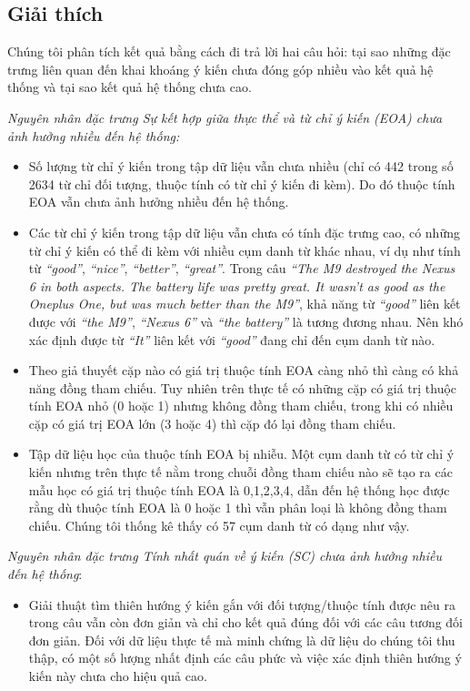 \documentclass[12pt]{report}
\begin{document}
		\subsection*{Giải thích}
			\par Chúng tôi phân tích kết quả bằng cách đi trả lời hai câu hỏi: tại sao những đặc trưng liên quan đến khai khoáng ý kiến chưa đóng góp nhiều vào kết quả hệ thống và tại sao kết quả hệ thống chưa cao.
			\par \textit{Nguyên nhân đặc trưng \textit{Sự kết hợp giữa thực thể và từ chỉ ý kiến (EOA)} chưa ảnh hưởng nhiều đến hệ thống:}
				\begin{itemize}
					\item{Số lượng từ chỉ ý kiến trong tập dữ liệu vẫn chưa nhiều (chỉ có 442 trong số 2634 từ chỉ đối tượng, thuộc tính có từ chỉ ý kiến đi kèm). Do đó thuộc tính EOA vẫn chưa ảnh hưởng nhiều đến hệ thống}.
					\item{Các từ chỉ ý kiến trong tập dữ liệu vẫn chưa có tính đặc trưng cao, có những từ chỉ ý kiến có thể đi kèm với nhiều cụm danh từ khác nhau, ví dụ như tính từ \textit{“good”}, \textit{“nice”}, \textit{“better”}, \textit{“great”}. Trong câu \textit{“The M9 destroyed the Nexus 6 in both aspects. The battery life was pretty great. It wasn't as good as the Oneplus One, but was much better than the M9”}, khả năng từ \textit{“good”} liên kết được với \textit{“the M9”}, \textit{“Nexus 6”} và \textit{“the battery”} là tương đương nhau. Nên khó xác định được từ \textit{“It”} liên kết với \textit{“good”} đang chỉ đến cụm danh từ nào}.
					\item{Theo giả thuyết cặp nào có giá trị thuộc tính EOA càng nhỏ thì càng có khả năng đồng tham chiếu. Tuy nhiên trên thực tế có những cặp có giá trị thuộc tính EOA nhỏ (0 hoặc 1) nhưng không đồng tham chiếu, trong khi có nhiều cặp có giá trị EOA lớn (3 hoặc 4) thì cặp đó lại đồng tham chiếu}.
					\item{Tập dữ liệu học của thuộc tính EOA bị nhiễu. Một cụm danh từ có từ chỉ ý kiến nhưng trên thực tế nằm trong chuỗi đồng tham chiếu nào sẽ tạo ra các mẫu học có  giá trị thuộc tính EOA là 0,1,2,3,4, dẫn đến hệ thống học được rằng dù thuộc tính EOA là 0 hoặc 1 thì vẫn phân loại là không đồng tham chiếu. Chúng tôi thống kê thấy có 57 cụm danh từ có dạng như vậy}.
				\end{itemize}
			\par \textit{Nguyên nhân đặc trưng \textit{Tính nhất quán về ý kiến (SC)} chưa ảnh hưởng nhiều đến hệ thống}:
				\begin{itemize}
					\item{Giải thuật tìm thiên hướng ý kiến gắn với đối tượng/thuộc tính được nêu ra trong câu vẫn còn đơn giản và chỉ cho kết quả đúng đối với các câu tương đối đơn giản. Đối với dữ liệu thực tế mà minh chứng là dữ liệu do chúng tôi thu thập, có một số lượng nhất định các câu phức và việc xác định thiên hướng ý kiến này chưa cho hiệu quả cao.}					
				\end{itemize}
\end{document}
